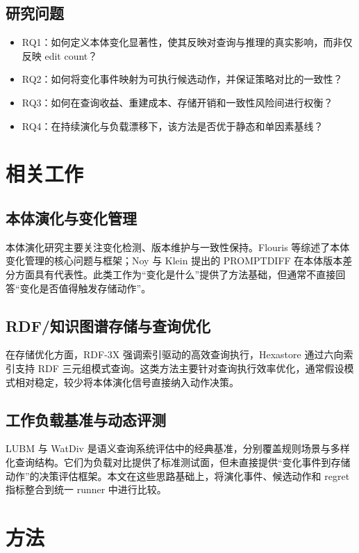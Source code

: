 \documentclass[12pt,a4paper]{ctexart}
\begin{document}
\subsection{研究问题}
\begin{itemize}
  \item RQ1：如何定义本体变化显著性，使其反映对查询与推理的真实影响，而非仅反映 edit count？
  \item RQ2：如何将变化事件映射为可执行候选动作，并保证策略对比的一致性？
  \item RQ3：如何在查询收益、重建成本、存储开销和一致性风险间进行权衡？
  \item RQ4：在持续演化与负载漂移下，该方法是否优于静态和单因素基线？
\end{itemize}

\section{相关工作}
\subsection{本体演化与变化管理}
本体演化研究主要关注变化检测、版本维护与一致性保持。Flouris 等综述了本体变化管理的核心问题与框架\cite{flouris2008ontology}；Noy 与 Klein 提出的 PROMPTDIFF 在本体版本差分方面具有代表性\cite{noy2004promptdiff}。此类工作为“变化是什么”提供了方法基础，但通常不直接回答“变化是否值得触发存储动作”。

\subsection{RDF/知识图谱存储与查询优化}
在存储优化方面，RDF-3X 强调索引驱动的高效查询执行\cite{neumann2010rdf3x}，Hexastore 通过六向索引支持 RDF 三元组模式查询\cite{weiss2008hexastore}。这类方法主要针对查询执行效率优化，通常假设模式相对稳定，较少将本体演化信号直接纳入动作决策。

\subsection{工作负载基准与动态评测}
LUBM\cite{guo2005lubm} 与 WatDiv\cite{aluc2014watdiv} 是语义查询系统评估中的经典基准，分别覆盖规则场景与多样化查询结构。它们为负载对比提供了标准测试面，但未直接提供“变化事件到存储动作”的决策评估框架。本文在这些思路基础上，将演化事件、候选动作和 regret 指标整合到统一 runner 中进行比较。

\section{方法}
\end{document}
